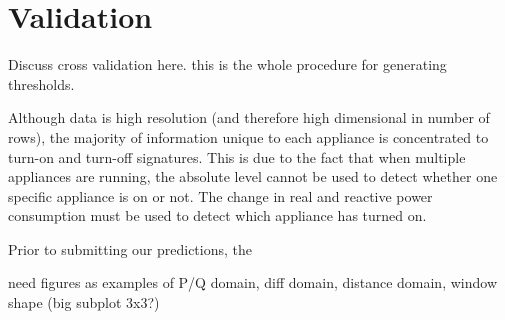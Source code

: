 \documentclass[conference]{IEEEtran}
\begin{document}
%



 


\section{Validation}\label{sec:cv}
Discuss cross validation here. this is the whole procedure for generating thresholds.

Although data is high resolution (and therefore high dimensional in number of rows), the majority of information unique to each appliance is concentrated to turn-on and turn-off signatures.  This is due to the fact that when multiple appliances are running, the absolute level cannot be used to detect whether one specific appliance is on or not.  The change in real and reactive power consumption must be used to detect which appliance has turned on.  

Prior to submitting our predictions, the 

need figures as examples of P/Q domain, diff domain, distance domain, window shape (big subplot 3x3?)
\end{document}
